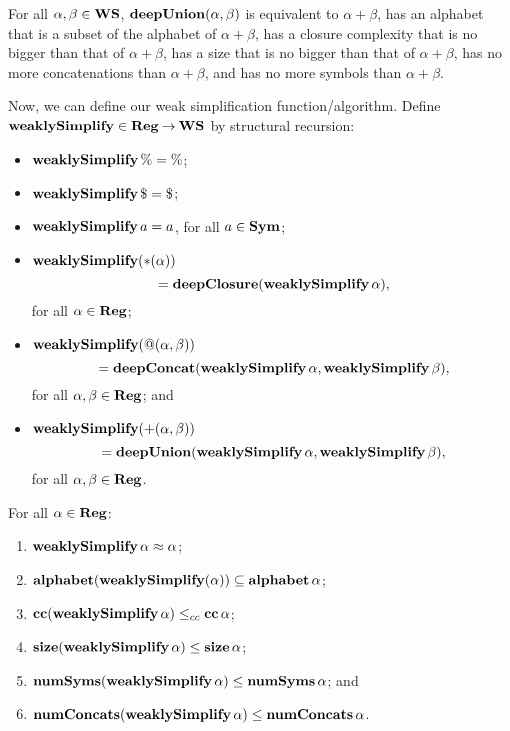 \begin{lemma}
\label{DeepUnionLem}
For all $\alpha,\beta\in\mathbf{WS}$, $\mathbf{deepUnion}(\alpha,\beta)$
is equivalent to $\alpha+\beta$, has an alphabet that is a
subset of the alphabet of $\alpha+\beta$, has a closure complexity
that is no bigger than that of $\alpha+\beta$, has a size that is no
bigger than that of $\alpha+\beta$, has no more concatenations than
$\alpha+\beta$, and has no more symbols than $\alpha+\beta$.
\end{lemma}

Now, we can define our weak simplification function/algorithm.
%
Define $\mathbf{weaklySimplify}\in\mathbf{Reg}\mathbin{\to}\mathbf{WS}$ by structural recursion:
\begin{itemize}
\item $\mathbf{weaklySimplify}\,\% = \%$;

\item $\weaklySimplify\,\$ = \$$;

\item $\mathbf{weaklySimplify}\,a = a$, for all $a\in\mathbf{Sym}$;

\item $\mathbf{weaklySimplify}({*}(\alpha))$
  \begin{displaymath}
    {} = \mathbf{deepClosure}(\mathbf{weaklySimplify}\,\alpha) ,
  \end{displaymath}
  for all $\alpha\in\mathbf{Reg}$;

\item $\mathbf{weaklySimplify}(@(\alpha,\beta))$
  \begin{displaymath}
    {} = \mathbf{deepConcat}(\mathbf{weaklySimplify}\,\alpha, \mathbf{weaklySimplify}\,\beta) ,
  \end{displaymath}
  for all $\alpha,\beta\in\mathbf{Reg}$; and

\item $\mathbf{weaklySimplify}({+}(\alpha,\beta))$
  \begin{displaymath}
    {} = \mathbf{deepUnion}(\mathbf{weaklySimplify}\,\alpha, \mathbf{weaklySimplify}\,\beta) ,
  \end{displaymath}
  for all $\alpha,\beta\in\mathbf{Reg}$.
\end{itemize}

\begin{proposition}
\label{WeakSimpProp1}
For all $\alpha\in\mathbf{Reg}$:
\begin{enumerate}[\quad(1)]
\item $\mathbf{weaklySimplify}\,\alpha\approx\alpha$;

\item $\mathbf{alphabet}(\mathbf{weaklySimplify}(\alpha))\subseteq\mathbf{alphabet}\,\alpha$;

\item $\mathbf{cc}(\mathbf{weaklySimplify}\,\alpha)\mathrel{\leq_{cc}}\mathbf{cc}\,\alpha$;

\item $\mathbf{size}(\mathbf{weaklySimplify}\,\alpha)\leq\mathbf{size}\,\alpha$;

\item $\mathbf{numSyms}(\mathbf{weaklySimplify}\,\alpha)\leq\mathbf{numSyms}\,\alpha$; and

\item $\mathbf{numConcats}(\mathbf{weaklySimplify}\,\alpha)\leq\mathbf{numConcats}\,\alpha$.
\end{enumerate}
\end{proposition}

